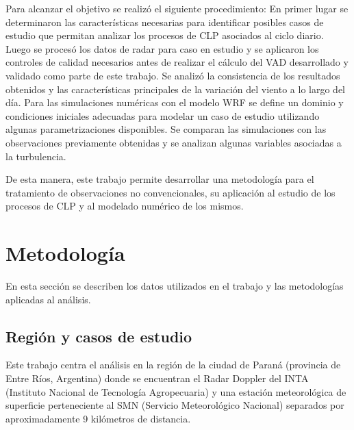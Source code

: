 \documentclass[12pt,spanish,oneside]{book}
\begin{document}
Para alcanzar el objetivo se realizó el siguiente procedimiento: En
primer lugar se determinaron las características necesarias para
identificar posibles casos de estudio que permitan analizar los procesos
de CLP asociados al ciclo diario. Luego se procesó los datos de radar
para caso en estudio y se aplicaron los controles de calidad necesarios
antes de realizar el cálculo del VAD desarrollado y validado como parte
de este trabajo. Se analizó la consistencia de los resultados obtenidos
y las características principales de la variación del viento a lo largo
del día. Para las simulaciones numéricas con el modelo WRF se define un
dominio y condiciones iniciales adecuadas para modelar un caso de
estudio utilizando algunas parametrizaciones disponibles. Se comparan
las simulaciones con las observaciones previamente obtenidas y se
analizan algunas variables asociadas a la turbulencia.

De esta manera, este trabajo permite desarrollar una metodología para el
tratamiento de observaciones no convencionales, su aplicación al estudio
de los procesos de CLP y al modelado numérico de los mismos.

\chapter{Metodología}\label{metodologia}

En esta sección se describen los datos utilizados en el trabajo y las
metodologías aplicadas al análisis.

\section{Región y casos de estudio}\label{region-y-casos-de-estudio}

Este trabajo centra el análisis en la región de la ciudad de Paraná
(provincia de Entre Ríos, Argentina) donde se encuentran el Radar
Doppler del INTA (Instituto Nacional de Tecnología Agropecuaria) y una
estación meteorológica de superficie perteneciente al SMN (Servicio
Meteorológico Nacional) separados por aproximadamente 9 kilómetros de
distancia.
\end{document}
